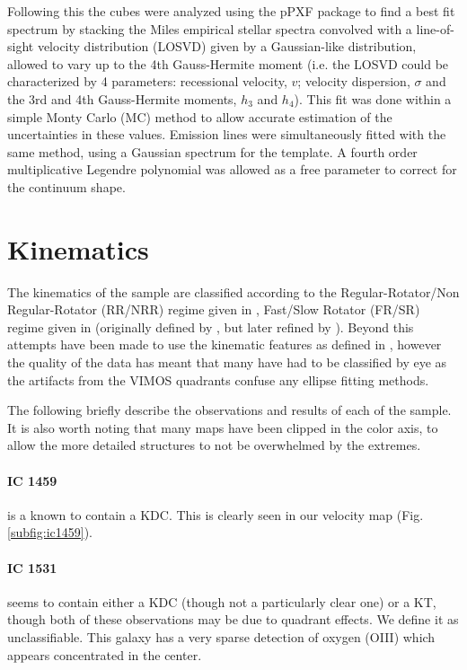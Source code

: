 \documentclass[a4paper,fleqn,usenatbib,useAMS]{mnras}
\begin{document}
		Following this the cubes were analyzed using the pPXF package \citep{Cappellari2004} to find a best fit spectrum by stacking the Miles empirical stellar spectra \citep{Sanchez-Blazquez2006} convolved with a line-of-sight velocity distribution (LOSVD) given by a Gaussian-like distribution, allowed to vary up to the 4th Gauss-Hermite moment (i.e. the LOSVD could be characterized by 4 parameters: recessional velocity, $v$; velocity dispersion, $\sigma$ and the 3rd and 4th Gauss-Hermite moments, $h_3$ and $h_4$). This fit was done within a simple Monty Carlo (MC) method to allow accurate estimation of the uncertainties in these values. Emission lines were simultaneously fitted with the same method, using a Gaussian spectrum for the template. A fourth order multiplicative Legendre polynomial was allowed as a free parameter to correct for the continuum shape. 

\section{Kinematics}
	\label{sec:kine}
	The kinematics of the sample are classified according to the Regular-Rotator/Non Regular-Rotator (RR/NRR) regime given in \citet{Krajnovic2011}, Fast/Slow Rotator (FR/SR) regime given in \citet{Cappellari2016} (originally defined by \citet{Emsellem2011}, but later refined by \citet{Cappellari2016}). Beyond this attempts have been made to use the kinematic features as defined in \citet{Krajnovic2011}, however the quality of the data has meant that many have had to be classified by eye as the artifacts from the VIMOS quadrants confuse any ellipse fitting methods. 

	The following briefly describe the observations and results of each of the sample. It is also worth noting that many maps have been clipped in the color axis, to allow the more detailed structures to not be overwhelmed by the extremes. 

	\paragraph{IC 1459} is a known to contain a KDC. This is clearly seen in our velocity map (Fig. \ref{subfig:ic1459}).

	\paragraph{IC 1531} seems to contain either a KDC (though not a particularly clear one) or a KT, though both of these observations may be due to quadrant effects. We define it as unclassifiable. This galaxy has a very sparse detection of oxygen (OIII) which appears concentrated in the center.
\end{document}
